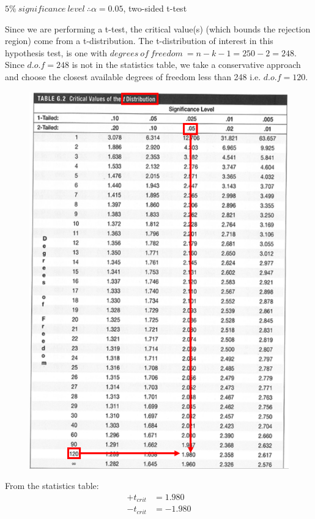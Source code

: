 \documentclass[12pt]{report}
\begin{document}
\noindent $5\%\ significance\ level\ \therefore \alpha = 0.05$, two-sided t-test

\noindent Since we are performing a t-test, the critical value(s) (which bounds the rejection region) come from a t-distribution. The t-distribution of interest in this hypothesis test, is one with $degrees\ of\ freedom\ = n - k - 1 = 250 - 2 = 248$. Since $d.o.f = 248$ is not in the statistics table, we take a conservative approach and choose the closest available degrees of freedom less than 248 i.e. $d.o.f=120$. 
\begin{figure}[H]
	\centering
	\includegraphics{tute6_q2_1}
\end{figure}
\vspace{-\baselineskip}
\noindent From the statistics table: \begin{align*}
	+t_{crit} &= 1.980 \\
	-t_{crit} &= -1.980
\end{align*}
\end{document}
